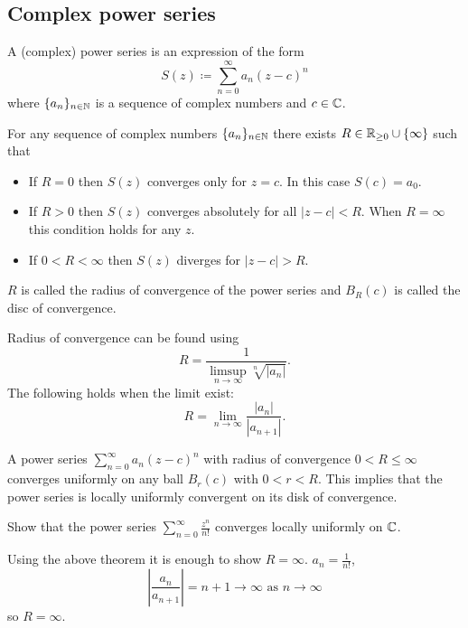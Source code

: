 \documentclass[10pt, a4paper]{article}
\begin{document}
\subsection{Complex power series}
\begin{definition}
    A
    (complex)
    power series is an expression of the form
    \[
    S(z) \coloneqq \sum_{n = 0}^{\infty}a_n(z - c) ^ n
    \]
    where $\{a_n\}_{n \in \mathbb{N}}$ is a sequence of complex numbers and $c \in \mathbb{C}$.
\end{definition}

\begin{theorem}
    For any sequence of complex numbers $\{a_n\}_{n \in \mathbb{N}}$ there exists $R \in \mathbb{R}_{\geq 0} \cup \{\infty\}$ such that
    \begin{itemize}
        \item If $R = 0$ then $S(z)$ converges only for $z = c$.
        In this case $S(c) = a_0$.

        \item If $R > 0$ then $S(z)$ converges absolutely for all $|z - c| < R$.
        When $R = \infty$ this condition holds for any $z$.

        \item If $0 < R < \infty$ then $S(z)$ diverges for $|z - c| > R$.
    \end{itemize}
    $R$ is called the radius of convergence of the power series and $B_R(c)$ is called the disc of convergence.
\end{theorem}

Radius of convergence can be found using
\[
R = \frac{1}{\limsup_{n \to \infty}\sqrt[n]{|a_n|}}.
\]
The following holds when the limit exist:
\[
R = \lim_{n \to \infty}\frac{|a_n|}{|a_{n + 1}|}.
\]

\begin{theorem}
    A power series $\sum_{n = 0}^{\infty}a_n(z - c) ^ n$ with radius of convergence $0 < R \leq \infty$ converges uniformly on any ball $B_r(c)$ with $0 < r < R$.
    This implies that the power series is locally uniformly convergent on its disk of convergence.
\end{theorem}

\begin{example}
    Show that the power series $\sum_{n = 0}^{\infty}\frac{z ^ n}{n!}$ converges locally uniformly on $\mathbb{C}$.

    \begin{solution}
        Using the above theorem it is enough to show $R = \infty$.
        $a_n = \frac{1}{n!}$,
        \[
        \left|\frac{a_n}{a_{n + 1}}\right| = n + 1 \to \infty\text{ as } n \to \infty
        \]
        so $R = \infty$.
    \end{solution}
\end{example}
\end{document}
